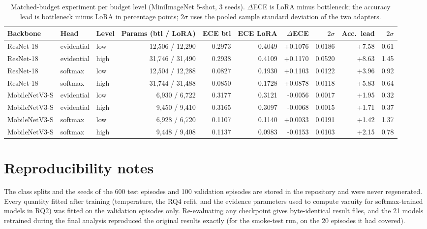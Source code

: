 \begin{table}[H]
\centering
\caption{Matched-budget experiment per budget level (MiniImageNet 5-shot, 3 seeds). $\Delta$ECE is LoRA minus
bottleneck; the accuracy lead is bottleneck minus LoRA in percentage points; $2\sigma$ uses the pooled sample
standard deviation of the two adapters.}
\label{tab:matched-levels}
\begin{adjustbox}{max width=\textwidth}
\begin{tabular}{@{}lllrrrrrrr@{}}
\toprule
Backbone & Head & Level & Params (btl / LoRA) & ECE btl & ECE LoRA & $\Delta$ECE & $2\sigma$ & Acc.\ lead & $2\sigma$ \\
\midrule
ResNet-18 & evidential & low & 12,506 / 12,290 & 0.2973 & 0.4049 & +0.1076 & 0.0186 & +7.58 & 0.61 \\
ResNet-18 & evidential & high & 31,746 / 31,490 & 0.2938 & 0.4109 & +0.1170 & 0.0520 & +8.63 & 1.45 \\
ResNet-18 & softmax & low & 12,504 / 12,288 & 0.0827 & 0.1930 & +0.1103 & 0.0122 & +3.96 & 0.92 \\
ResNet-18 & softmax & high & 31,744 / 31,488 & 0.0850 & 0.1728 & +0.0878 & 0.0118 & +5.83 & 0.64 \\
MobileNetV3-S & evidential & low & 6,930 / 6,722 & 0.3177 & 0.3121 & -0.0056 & 0.0017 & +1.95 & 0.32 \\
MobileNetV3-S & evidential & high & 9,450 / 9,410 & 0.3165 & 0.3097 & -0.0068 & 0.0015 & +1.71 & 0.37 \\
MobileNetV3-S & softmax & low & 6,928 / 6,720 & 0.1107 & 0.1140 & +0.0033 & 0.0191 & +1.42 & 1.37 \\
MobileNetV3-S & softmax & high & 9,448 / 9,408 & 0.1137 & 0.0983 & -0.0153 & 0.0103 & +2.15 & 0.78 \\
\bottomrule
\end{tabular}
\end{adjustbox}
\end{table}

\section*{Reproducibility notes}

The class splits and the seeds of the 600 test episodes and 100 validation episodes are stored in the
repository and were never regenerated. Every quantity fitted after training (temperature, the RQ4 refit, and
the evidence parameters used to compute vacuity for softmax-trained models in RQ2) was fitted on the
validation episodes only. Re-evaluating any checkpoint gives byte-identical result files, and the 21 models
retrained during the final analysis reproduced the original results exactly (for the smoke-test run, on the 20 episodes it had covered).
